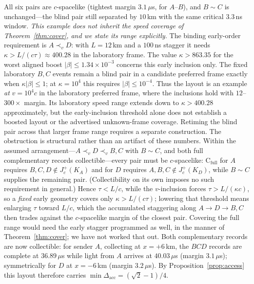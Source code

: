 \documentclass[10pt,twocolumn]{article}
\newcommand{\Dacc}{\Delta_{\mathrm{acc}}}
\newcommand{\CFull}{\mathrm{C}_{\mathrm{full}}}
\begin{document}
All six pairs are $c$-spacelike (tightest margin $3.1\,\mu$s, for $A$--$B$), and $B\sim C$ is unchanged---the blind pair still separated by $10$\,km with the same critical $3.3$\,ns window. \emph{This example does not inherit the speed coverage of Theorem~\ref{thm:cover}, and we state its range explicitly.} The binding early-order requirement is $A\prec_v D$: with $L=12$\,km and a $100$\,ns stagger it needs $\kappa>L/(c\tau)\approx400.28$ in the laboratory frame. The value $\kappa>863.35$ for the worst aligned boost $|\beta|\le1.34\times10^{-3}$ concerns this early inclusion only. The fixed laboratory $B,C$ events remain a blind pair in a candidate preferred frame exactly when $\kappa|\beta|\le1$; at $\kappa=10^4$ this requires $|\beta|\le10^{-4}$. Thus the layout is an example \emph{at} $v=10^4c$ in the laboratory preferred frame, where the inclusions hold with $12$--$300\times$ margin. Its laboratory speed range extends down to $\kappa>400.28$ approximately, but the early-inclusion threshold alone does not establish a boosted layout or the advertised unknown-frame coverage. Retiming the blind pair across that larger frame range requires a separate construction. The obstruction is structural rather than an artifact of these numbers. Within the assumed arrangement---$A\prec_v D\prec_v B,C$ with $B\sim C$, and both full complementary records collectible---every pair must be $c$-spacelike: $\CFull$ for $A$ requires $B,C,D\notin J_c^+(K_A)$ and for $D$ requires $A,B,C\notin J_c^+(K_D)$, while $B\sim C$ supplies the remaining pair. (Collectibility on its own imposes no such requirement in general.) Hence $\tau<L/c$, while the $v$-inclusion forces $\tau>L/(\kappa c)$, so a \emph{fixed} early geometry covers only $\kappa>L/(c\tau)$; lowering that threshold means enlarging $\tau$ toward $L/c$, which the accumulated staggering along $A\to D\to B,C$ then trades against the $c$-spacelike margin of the closest pair. Covering the full range would need the early stagger programmed as well, in the manner of Theorem~\ref{thm:cover}; we have not worked that out. Both complementary records are now collectible: for sender $A$, collecting at $x=+6$\,km, the $BCD$ records are complete at $36.89\,\mu$s while light from $A$ arrives at $40.03\,\mu$s (margin $3.1\,\mu$s); symmetrically for $D$ at $x=-6$\,km (margin $3.2\,\mu$s). By Proposition~\ref{prop:access} this layout therefore carries $\min\Dacc=(\sqrt2-1)/4$.
\end{document}
